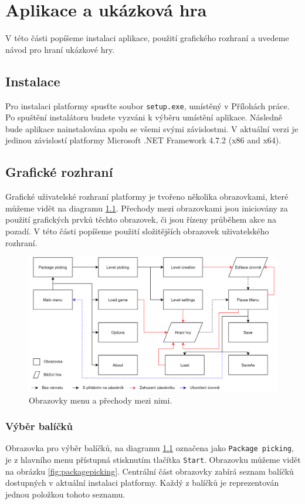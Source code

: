 \chapter{Aplikace a ukázková hra}
V této části popíšeme instalaci aplikace, použití grafického rozhraní a uvedeme návod pro hraní ukázkové hry. 

\section{Instalace}
Pro instalaci platformy spusťte soubor \texttt{setup.exe}, umístěný v Přílohách práce. Po spuštění instalátoru budete vyzváni k výběru umístění aplikace. Následně bude aplikace nainstalována spolu se všemi svými závislostmi. V aktuální verzi je jedinou závislostí platformy Microsoft .NET Framework 4.7.2 (x86 and x64).

\section{Grafické rozhraní}
Grafické uživatelské rozhraní platformy je tvořeno několika obrazovkami, které můžeme vidět na diagramu \ref{fig:screen_structure2}. Přechody mezi obrazovkami jsou iniciovány za použití grafických prvků těchto obrazovek, či jsou řízeny průběhem akce na pozadí. V této části popíšeme použití složitějších obrazovek uživatelského rozhraní.

\begin{figure}[h]
	\centering
	\includegraphics[width=\textwidth]{img/ScreenStructure.png}
	\caption{Obrazovky menu a přechody mezi nimi.}
	\label{fig:screen_structure2}
\end{figure}

\subsection{Výběr balíčků}
Obrazovka pro výběr balíčků, na diagramu \ref{fig:screen_structure2} označena jako \texttt{Package picking}, je z hlavního menu přístupná stisknutím tlačítka \texttt{Start}. Obrazovku můžeme vidět na obrázku \ref{fig:packagepicking}. Centrální část obrazovky zabírá seznam balíčků dostupných v aktuální instalaci platformy. Každý z balíčků je reprezentován jednou položkou tohoto seznamu. 

